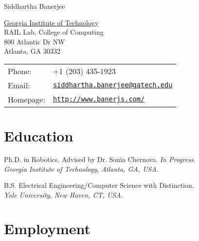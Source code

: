 \documentclass[letterpaper]{article}
\def\name{Siddhartha Banerjee}
\begin{document}
{\huge \name}


\vspace{0.25in}

\begin{minipage}{0.45\linewidth}
  \href{}{Georgia Institute of Technology} \\
  RAIL Lab, College of Computing \\
  800 Atlantic Dr NW \\
  Atlanta, GA 30332
\end{minipage}
\begin{minipage}{0.45\linewidth}
  \begin{tabular}{ll}
    Phone: & +1 (203) 435-1923 \\
    Email: & \href{mailto:siddhartha.banerjee@gatech.edu}{\tt siddhartha.banerjee@gatech.edu} \\
    Homepage: & \href{http://www.banerjs.com/}{\tt http://www.banerjs.com/} \\
  \end{tabular}
\end{minipage}

\section*{Education}

\begin{description}[leftmargin=7.5em, style=nextline]
  \item[2015 --- ] Ph.D. in Robotics. Advised by Dr. Sonia Chernova. \textit{In Progress}. \\ \textit{Georgia Institute of Technology, Atlanta, GA, USA}.

  \item[2009 --- 2013] B.S. Electrical Engineering/Computer Science with Distinction. \\ \textit{Yale University, New Haven, CT, USA}.
\end{description}

\section*{Employment}
\end{document}
